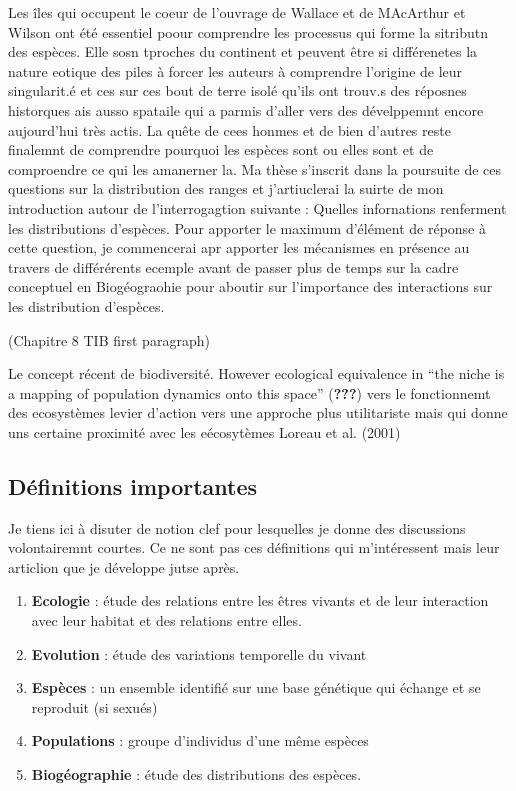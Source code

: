Les îles qui occupent le coeur de l'ouvrage de Wallace et de MAcArthur
et Wilson ont été essentiel poour comprendre les processus qui forme la
sitributn des espèces. Elle sosn tproches du continent et peuvent être
si différenetes la nature eotique des piles à forcer les auteurs à
comprendre l'origine de leur singularit.é et ces sur ces bout de terre
isolé qu'ils ont trouv.s des réposnes historques ais ausso spataile qui
a parmis d'aller vers des dévelppemnt encore aujourd'hui très actis. La
quête de cees honmes et de bien d'autres reste finalemnt de comprendre
pourquoi les espèces sont ou elles sont et de comproendre ce qui les
amanerner la. Ma thèse s'inscrit dans la poursuite de ces questions sur
la distribution des ranges et j'artiuclerai la suirte de mon
introduction autour de l'interrogagtion suivante : Quelles infornations
renferment les distributions d'espèces. Pour apporter le maximum
d'élément de réponse à cette question, je commencerai apr apporter les
mécanismes en présence au travers de différérents ecemple avant de
passer plus de temps sur la cadre conceptuel en Biogéograohie pour
aboutir sur l'importance des interactions sur les distribution
d'espèces.

(Chapitre 8 TIB first paragraph)

Le concept récent de biodiversité. However ecological equivalence in
``the niche is a mapping of population dynamics onto this space''
({\textbf{???}}) vers le fonctionnemt des ecosystèmes levier d'action
vers une approche plus utilitariste mais qui donne uns certaine
proximité avec les eécosytèmes Loreau et al. (2001)

\subsection*{Définitions importantes}\label{duxe9finitions-importantes}

Je tiens ici à disuter de notion clef pour lesquelles je donne des
discussions volontairemnt courtes. Ce ne sont pas ces définitions qui
m'intéressent mais leur articlion que je développe jutse après.

\begin{enumerate}
\def\labelenumi{\arabic{enumi}.}
\item
  \textbf{Ecologie} : étude des relations entre les êtres vivants et de
  leur interaction avec leur habitat et des relations entre elles.
\item
  \textbf{Evolution} : étude des variations temporelle du vivant
\item
  \textbf{Espèces} : un ensemble identifié sur une base génétique qui
  échange et se reproduit (si sexués)
\item
  \textbf{Populations} : groupe d'individus d'une même espèces
\item
  \textbf{Biogéographie} : étude des distributions des espèces.
\end{enumerate}

